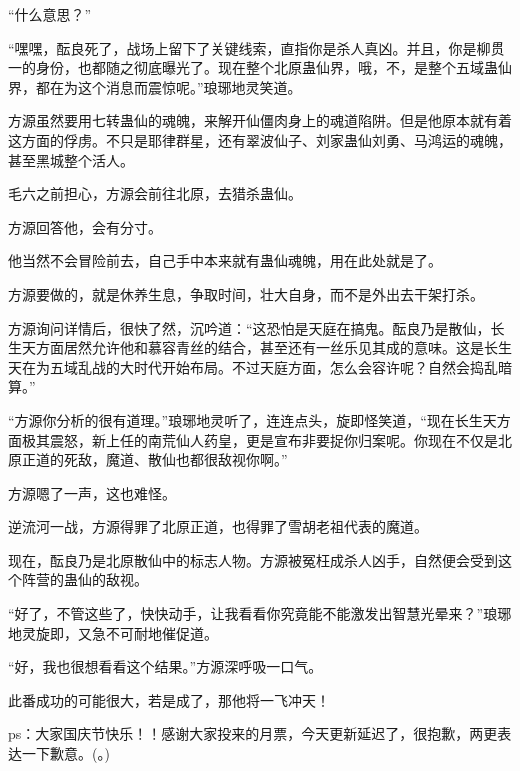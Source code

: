 \begin{this_body}
“什么意思？”

“嘿嘿，酝良死了，战场上留下了关键线索，直指你是杀人真凶。并且，你是柳贯一的身份，也都随之彻底曝光了。现在整个北原蛊仙界，哦，不，是整个五域蛊仙界，都在为这个消息而震惊呢。”琅琊地灵笑道。

方源虽然要用七转蛊仙的魂魄，来解开仙僵肉身上的魂道陷阱。但是他原本就有着这方面的俘虏。不只是耶律群星，还有翠波仙子、刘家蛊仙刘勇、马鸿运的魂魄，甚至黑城整个活人。

毛六之前担心，方源会前往北原，去猎杀蛊仙。

方源回答他，会有分寸。

他当然不会冒险前去，自己手中本来就有蛊仙魂魄，用在此处就是了。

方源要做的，就是休养生息，争取时间，壮大自身，而不是外出去干架打杀。

方源询问详情后，很快了然，沉吟道：“这恐怕是天庭在搞鬼。酝良乃是散仙，长生天方面居然允许他和慕容青丝的结合，甚至还有一丝乐见其成的意味。这是长生天在为五域乱战的大时代开始布局。不过天庭方面，怎么会容许呢？自然会捣乱暗算。”

“方源你分析的很有道理。”琅琊地灵听了，连连点头，旋即怪笑道，“现在长生天方面极其震怒，新上任的南荒仙人药皇，更是宣布非要捉你归案呢。你现在不仅是北原正道的死敌，魔道、散仙也都很敌视你啊。”

方源嗯了一声，这也难怪。

逆流河一战，方源得罪了北原正道，也得罪了雪胡老祖代表的魔道。

现在，酝良乃是北原散仙中的标志人物。方源被冤枉成杀人凶手，自然便会受到这个阵营的蛊仙的敌视。

“好了，不管这些了，快快动手，让我看看你究竟能不能激发出智慧光晕来？”琅琊地灵旋即，又急不可耐地催促道。

“好，我也很想看看这个结果。”方源深呼吸一口气。

此番成功的可能很大，若是成了，那他将一飞冲天！

ps：大家国庆节快乐！！感谢大家投来的月票，今天更新延迟了，很抱歉，两更表达一下歉意。(。)

\end{this_body}

